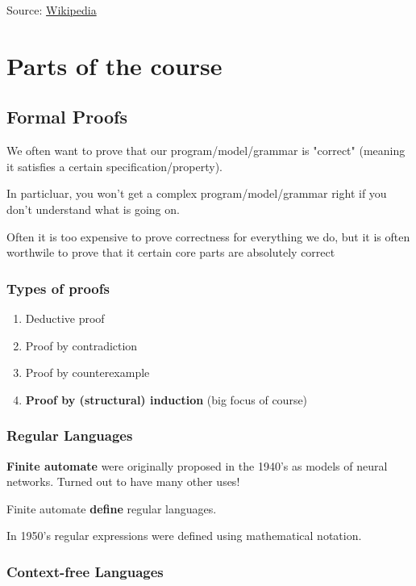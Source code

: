 \documentclass{article}
\begin{document}
Source: \href{https://en.wikipedia.org/wiki/Context-free_grammar}{Wikipedia}

\section{Parts of the course}

\subsection{Formal Proofs}

We often want to prove that our program/model/grammar is "correct" (meaning it satisfies a certain specification/property).

In particluar, you won't get a complex program/model/grammar right if you don't understand what is going on.

Often it is too expensive to prove correctness for everything we do, but it is often worthwile to prove that it certain core parts are absolutely correct

\subsubsection{Types of proofs}

\begin{enumerate}
    \item Deductive proof
    \item Proof by contradiction
    \item Proof by counterexample
    \item \textbf{Proof by (structural) induction} (big focus of course)
\end{enumerate}

\subsubsection{Regular Languages}

\textbf{Finite automate} were originally proposed in the 1940's as models of neural networks. Turned out to have many other uses!

Finite automate \textbf{define} regular languages.

In 1950's regular expressions were defined using mathematical notation.

\subsubsection{Context-free Languages}
\end{document}
